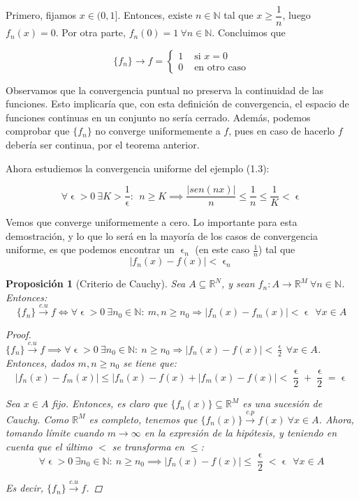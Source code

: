 \documentclass[11pt, a4paper]{article}
\let\epsilon\upvarepsilon
\providecommand{\abs}[1]{\lvert#1\rvert}
\newcommand{\N}{\mathbb{N}}
\newcommand{\fn}{\{f_n\}}
\theoremstyle{theorem-style}
\newtheorem*{nprop}{Proposición}
\theoremstyle{definition-style}
\theoremstyle{remark-style}
\theoremstyle{example-style}
\begin{document}
Primero, fijamos $x\in (0,1]$. Entonces, existe $n\in \N$ tal que $x \ge \dfrac{1}{n}$, luego $f_n(x) = 0$. Por otra parte, $f_n(0) = 1\ \forall n\in \N$. Concluimos que

\[
	\fn\to f = \begin{cases}
	1 & \text{ si } x=0\\
	0 & \text{ en otro caso}
\end{cases}
\]

Observamos que la convergencia puntual no preserva la continuidad de las funciones. Esto implicaría que, con esta definición de convergencia, el espacio de funciones continuas en un conjunto no sería cerrado. Además, podemos comprobar que $\fn$ no converge uniformemente a $f$, pues en caso de hacerlo $f$ debería ser continua, por el teorema anterior.

Ahora estudiemos la convergencia uniforme del ejemplo (1.3):

\[
\forall\epsilon>0\ \exists K>\dfrac{1}{\epsilon}:\ \ n\ge K \implies \dfrac{\abs{sen(nx)}}{n} \le \dfrac{1}{n} \le \dfrac{1}{K} < \epsilon
\]

Vemos que converge uniformemente a cero. Lo importante para esta demostración, y lo que lo será en la mayoría de los casos de convergencia uniforme, es que podemos encontrar un $\epsilon_n$ (en este caso $\frac{1}{n}$) tal que
\[
\abs{f_n(x)-f(x)} < \epsilon_n
\]

\begin{nprop}[Criterio de Cauchy]
	Sea $A \subseteq \mathbb{R}^N$, y sean $f_n: A \longrightarrow \mathbb{R}^M \ \forall n \in \mathbb{N}$. Entonces: $$\fn \xrightarrow {c.u} f \iff \forall \epsilon > 0\ \exists n_0 \in \mathbb{N}:\ m,n \ge n_0 \Rightarrow |f_n(x) - f_m(x)| < \epsilon\ \ \forall x \in A$$
	
\begin{proof} \hfill \\
\boxed{\Rightarrow}	 $\fn \xrightarrow {c.u} f \implies \forall \epsilon > 0\ \exists n_0 \in \mathbb{N}:\ n \ge n_0 \Rightarrow |f_n(x) - f(x)| < \frac{\epsilon}{2}\ \forall x \in A$. Entonces, dados $m,n \ge n_0$ se tiene que: $$ |f_n(x) - f_m(x)| \le |f_n(x) - f(x) + |f_m(x) - f(x)| < \frac{\epsilon}{2} + \frac{\epsilon}{2} = \epsilon$$

\boxed{\Leftarrow} Sea $x \in A$ fijo. Entonces, es claro que $\{f_n(x)\} \subseteq \mathbb{R}^M$ es una sucesión de Cauchy. Como $\mathbb{R}^M$ es completo, tenemos que $\{f_n(x)\} \xrightarrow {c.p} f(x)\ \forall x \in A$. Ahora, tomando límite cuando $m \to \infty$ en la expresión de la hipótesis, y teniendo en cuenta que el último $<$ se transforma en $\le$: $$\forall \epsilon > 0\ \exists n_0 \in \mathbb{N}:\ n \ge n_0 \implies |f_n(x) - f(x)| \le \frac{\epsilon}{2} < \epsilon\ \ \forall x \in A$$

Es decir, $\fn \xrightarrow {c.u} f$.
\end{proof}
\end{nprop}
\end{document}
